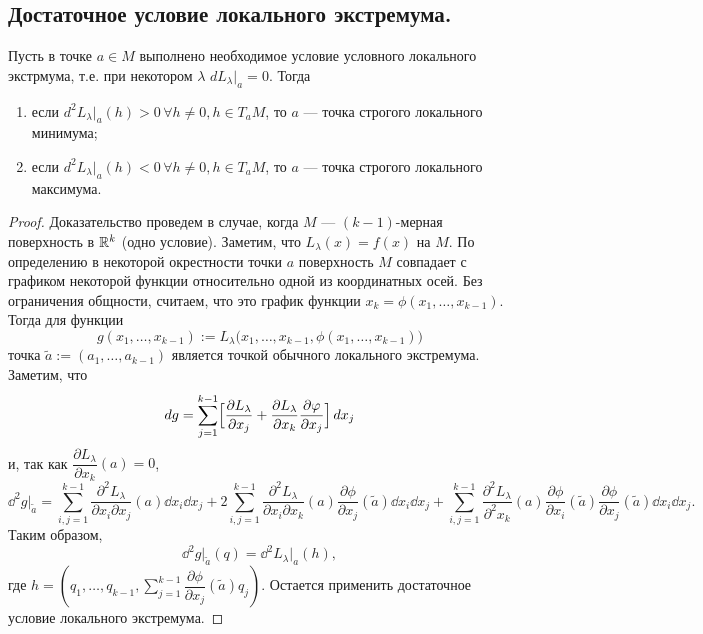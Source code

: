 \documentclass[a4paper]{article}
\theoremstyle{named}
\begin{document}
    \subsection{Достаточное условие локального экстремума.}
    
    \begin{theorem*}
        Пусть в точке $a\in M$ выполнено необходимое условие условного локального экстрмума, т.е. при некотором $\lambda$ $dL_\lambda\bigl|_a=0$.
        Тогда
        \begin{enumerate}
        \item
            если $d^2L_\lambda\bigl|_a(h)>0\, \forall h\ne0, h\in T_aM$, то $a$ --- точка строгого локального минимума;
    
        \item
            если $d^2L_\lambda\bigl|_a(h)<0\, \forall h\ne0, h\in T_aM$, то $a$ --- точка строгого локального максимума.
        \end{enumerate}
    \end{theorem*}
    
    \begin{proof}
        Доказательство проведем в случае, когда $M$ --- $(k-1)$-мерная поверхность в $\mathbb{R}^k$ (одно условие). Заметим, что $L_\lambda(x) = f(x)$ на $M$.
        По определению в некоторой окрестности точки $a$ поверхность $M$ совпадает с графиком некоторой функции относительно одной из координатных осей.
        Без ограничения общности, считаем, что это график функции $x_k = \phi(x_1,\ldots, x_{k-1})$.
        Тогда для функции
        $$
            g(x_1,\ldots, x_{k-1}) := L_\lambda\bigl(x_1,\ldots, x_{k-1}, \phi(x_1,\ldots, x_{k-1})\bigr)
        $$
        точка $\tilde{a}:=(a_1,\ldots, a_{k-1})$ является точкой обычного локального экстремума.
        Заметим, что
        $$
            \mathop{}\!d g = \sum_{j=1}^{k-1}\Bigl[\dfrac{\partial L_\lambda}{\partial x_j}+\dfrac{\partial L_\lambda}{\partial x_k}\dfrac{\partial\varphi}{\partial x_j}\Bigr]\mathop{}\!d x_j
        $$
        и, так как $\dfrac{\partial L_\lambda}{\partial x_k}(a)=0$,
        $$
            \dd^2g\bigl|_{\tilde{a}}
            = \sum_{i,j=1}^{k-1}\dfrac{\partial^2 L_\lambda}{\partial x_i\partial x_j}(a)\dd x_i \dd x_j
            +2\sum_{i,j=1}^{k-1}\dfrac{\partial^2 L_\lambda}{\partial x_i\partial x_k}(a)
            \dfrac{\partial\phi}{\partial x_j}(\tilde{a})\dd x_i \dd x_j
            +\sum_{i,j=1}^{k-1}\dfrac{\partial^2 L_\lambda}{\partial^2 x_k}(a)
            \dfrac{\partial\phi}{\partial x_i}(\tilde{a})\dfrac{\partial \phi}{\partial x_j}(\tilde{a})\dd x_i \dd x_j.
        $$
        Таким образом,
        $$
            \dd^2 g \bigl|_{\tilde{a}}(q)	= \dd^2L_\lambda\bigl|_a(h),
        $$
        где $h = \left(q_1,\ldots, q_{k-1}, \sum\limits_{j=1}^{k-1}\dfrac{\partial \phi}{\partial x_j}(\tilde{a})q_j\right)$. Остается применить
        достаточное условие локального экстремума.
    \end{proof}
\end{document}
